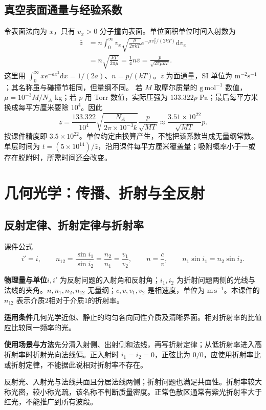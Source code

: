 \documentclass[UTF8,fontset=none,zihao=-4,a4paper]{ctexart}
\newcommand{\chapterpage}[1]{\clearpage\section{#1}}
\newcommand{\explain}[3]{\par\noindent\textbf{物理量与单位}\quad #1\par
\noindent\textbf{适用条件}\quad #2\par
\noindent\textbf{使用场景与方法}\quad #3\par}
\begin{document}
\subsection{真空表面通量与经验系数}
令表面法向为 $x$，只有 $v_x>0$ 分子撞向表面。单位面积单位时间入射数为
\begin{align*}
\bar z&=n\int_0^\infty v_x\sqrt{\frac\mu{2\pi kT}}e^{-\mu v_x^2/(2kT)}\mathrm dv_x\\
&=n\sqrt{\frac{kT}{2\pi\mu}}=\frac14n\bar v
=\frac p{\sqrt{2\pi\mu kT}}.
\end{align*}
这里用 $\int_0^\infty xe^{-ax^2}\mathrm dx=1/(2a)$、$n=p/(kT)$。$\bar z$ 为面通量，SI 单位为 $\mathrm{m^{-2}s^{-1}}$；其名称虽与碰撞节相同，但量纲不同。
若 $M$ 取摩尔质量的 $\mathrm{g\,mol^{-1}}$ 数值，$\mu=10^{-3}M/N_A$ kg；若 $p$ 用 Torr 数值，实际压强为 $133.322p$ Pa；最后每平方米换成每平方厘米要除 $10^4$。因此
\[
\bar z=\frac{133.322}{10^4}\sqrt{\frac{N_A}{2\pi\times10^{-3}k}}\frac p{\sqrt{MT}}
\approx\frac{3.51\times10^{22}}{\sqrt{MT}}p.
\]
按课件精度即 $3.5\times10^{22}$。单位约定由换算产生，不能把该系数当成无量纲常数。单层时间为 $t=(5\times10^{14})/\bar z$，沿用课件每平方厘米覆盖量；吸附概率小于一或存在脱附时，所需时间还会改变。

\chapterpage{几何光学：传播、折射与全反射}
\subsection{反射定律、折射定律与折射率}
\begin{infobox}{课件公式}
\[
 i'=i,\qquad n_{12}=\frac{\sin i_1}{\sin i_2}
 =\frac{n_2}{n_1}=\frac{v_1}{v_2},\qquad n=\frac cv,
 \qquad n_1\sin i_1=n_2\sin i_2.
\]
\end{infobox}
\explain{$i,i'$ 为反射问题的入射角和反射角；$i_1,i_2$ 为折射问题两侧的光线与法线的夹角。$n,n_1,n_2,n_{12}$ 无量纲；$c,v,v_1,v_2$ 是相速度，单位为 $\mathrm{m\,s^{-1}}$。本课件的 $n_{12}$ 表示介质2相对于介质1的折射率。}{几何光学近似、静止的均匀各向同性介质及清晰界面。相对折射率的比值应比较同一频率的光。}{先分清入射侧、出射侧和法线，再写折射定律；从低折射率进入高折射率时折射光向法线偏。正入射时 $i_1=i_2=0$，正弦比为 $0/0$，应使用折射率比或折射定律，不能据此说相对折射率不存在。}
反射光、入射光与法线共面且分居法线两侧；折射问题也满足共面性。折射率较大称光密，较小称光疏，该名称不判断质量密度。正常色散区通常有紫光折射率大于红光，不能推广到所有波段。
\end{document}
